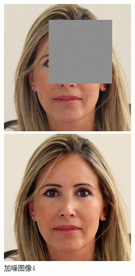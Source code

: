 \begin{figure}[H]
  \centering
  \begin{minipage}[b]{0.3\linewidth}
\includegraphics[width=\linewidth]{Picture/input/input_box.png}
    \caption{加噪图像4}
    \label{noised image 4}
  \end{minipage}
  \hspace{0.1cm} %
   \begin{minipage}[b]{0.3\linewidth}
    \includegraphics[width=\linewidth]{Picture/label/label_box.png}

\end{minipage}
\end{figure}
